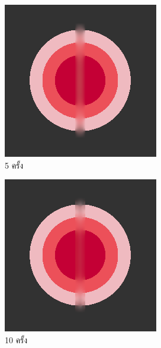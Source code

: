 \begin{figure}[H]
    \centering
    \begin{subfigure}{0.4\linewidth}
        \centering
        \includegraphics[width=0.7\linewidth]{image/just10enough/only5time.png}
        \caption{5 ครั้ง}
    \end{subfigure}
    \begin{subfigure}{0.4\linewidth}
        \centering
        \includegraphics[width=0.7\linewidth]{image/just10enough/only10time.png}
        \caption{10 ครั้ง}
    \end{subfigure}
    \begin{subfigure}{0.4\linewidth}
        \centering

\end{subfigure}
\end{figure}
